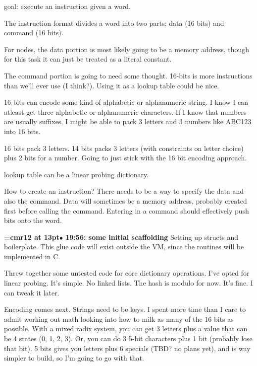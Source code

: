 goal: execute an instruction given a word.
\par

The instruction format divides a word into two parts: data (16 bits) and command (16 bits).
\par

For nodes, the data portion is most likely going to be a memory address, though for this task it can just be treated as a literal constant.
\par

The command portion is going to need some thought. 16-bits is more instructions than we'll ever use (I think?). Using it as a lookup table could be nice.
\par

16 bits can encode some kind of alphabetic or alphanumeric string. I know I can atleast get three alphabetic or alphanumeric characters. If I know that numbers are usually suffixes, I might be able to pack 3 letters and 3 numbers like ABC123 into 16 bits.
\par

16 bits pack 3 letters. 14 bits packs 3 letters (with constraints on letter choice) plus 2 bits for a number. Going to just stick with the 16 bit encoding approach.
\par

lookup table can be a linear probing dictionary.
\par

How to create an instruction? There needs to be a way to specify the data and also the command. Data will sometimes be a memory address, probably created first before calling the command. Entering in a command should effectively push bits onto the word.
\par

{\smallskip\noindent\bf\font\titlefont=cmr12 at 13pt\titlefont $\bullet$ 19:56: some initial scaffolding}\smallskip
Setting up structs and boilerplate. This glue code will exist outside the VM, since the routines will be implemented in C.
\par

Threw together some untested code for core dictionary operations. I've opted for linear probing. It's simple. No linked lists. The hash is modulo for now. It's fine. I can tweak it later.
\par

Encoding comes next. Strings need to be keys. I spent more time than I care to admit working out math looking into how to milk as many of the 16 bits as possible. With a mixed radix system, you can get 3 letters plus a value that can be 4 states (0, 1, 2, 3). Or, you can do 3 5-bit characters plus 1 bit (probably lose that bit). 5 bits gives you letters plus 6 specials (TBD? no plans yet), and is way simpler to build, so I'm going to go with that.
\par

